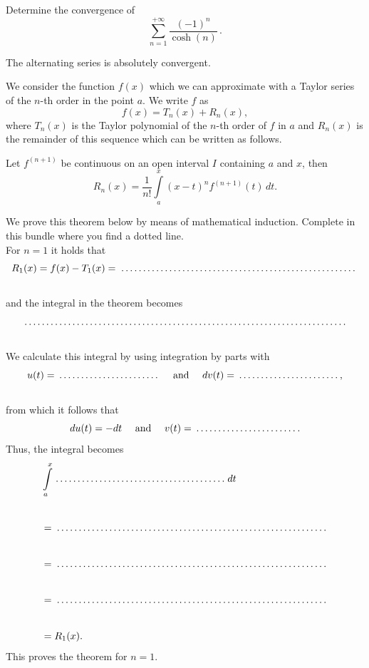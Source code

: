 \begin{Exercise}  %
Determine the convergence of
$$
\sum\limits_{n=1}^{+\infty}\dfrac{(-1)^n}{\cosh(n)}\,.
$$
\end{Exercise}

\begin{Answer}\phantom{}
The alternating series is absolutely convergent.
\end{Answer}

\begin{Exercise} %
We consider the function $f(x)$ which we can approximate with a Taylor series of the $n$-th order in the point $a$. We write $f$ as
\[f(x) = T_n(x) + R_n(x),  \]
where $T_n(x)$ is the Taylor polynomial of the $n$-th order of $f$ in $a$ and $R_n(x)$ is the remainder of this sequence which can be written as follows.\\
\begin{theorem}
Let $f^{(n+1)}$ be continuous on an open interval $I$ containing $a$ and $x$, then
\[R_n(x) = \dfrac{1}{n!} \int\limits_{a}^{x} (x-t)^n f^{(n+1)} (t) \, dt. \]
\end{theorem}

We prove this theorem below by means of mathematical induction. Complete in this bundle where you find a dotted line. \\

For $n=1$ it holds that
\\[0.5cm]
\[R_1(x) = f(x) - T_1(x) = \dotrule{0.70\textwidth}%
\]
\\[0.5cm]
and the integral in the theorem becomes
\\[0.5cm]
\[\dotrule{0.95\textwidth}%
\]
\\[0.5cm]
We calculate this integral by using integration by parts with
\\[0.2cm]
\[ u(t) = \dotrule{0.30\textwidth} \quad \text{ and } \quad dv(t) = \dotrule{0.30\textwidth},\]
\\[0.2cm]
from which it follows that
\[ du(t) = -dt \quad \text{ and } \quad v(t) = \dotrule{0.30\textwidth}.\]
Thus, the integral becomes
\begin{align*}
&\int\limits_{a}^{x} \dotrule{0.50\textwidth} \, dt	\\[0.75cm]
&= \dotrule{0.80\textwidth} \\[0.75cm]
&= \dotrule{0.80\textwidth} \\[0.75cm]
&=\dotrule{0.80\textwidth} \\[0.75cm]
&= R_1(x).	
\end{align*}
This proves the theorem for $n=1$. \npar


\end{Exercise}
